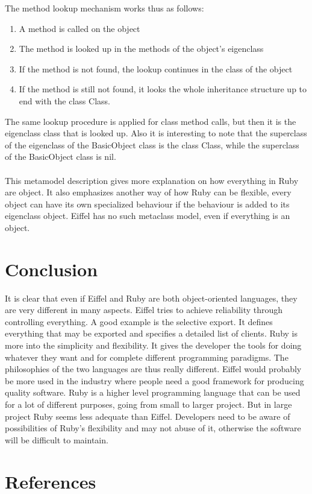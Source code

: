 \documentclass[12pt,a4paper,twocolumn]{article}
\begin{document}
The method lookup mechanism works thus as follows: 
\begin{enumerate}
	\item A method is called on the object
	\item The method is looked up in the methods of the object's eigenclass
	\item If the method is not found, the lookup continues in the class of the object
	\item If the method is still not found, it looks the whole inheritance structure up to end with the class Class. 
\end{enumerate}
The same lookup procedure is applied for class method calls, but then it is the eigenclass class that is looked up. Also it is interesting to note that the superclass of the eigenclass of the BasicObject class is the class Class, while the superclass of the BasicObject class is nil.
\\
\\
This metamodel description gives more explanation on how everything in Ruby are object. It also emphasizes another way of how Ruby can be flexible, every object can have its own specialized behaviour if the behaviour is added to its eigenclass object. Eiffel has no such metaclass model, even if everything is an object. 
\section{Conclusion}
It is clear that even if Eiffel and Ruby are both object-oriented languages, they are very different in many aspects. Eiffel tries to achieve reliability through controlling everything. A good example is the selective export. It defines everything that may be exported and specifies a detailed list of clients. Ruby is more into the simplicity and flexibility. It gives the developer the tools for doing whatever they want and for complete different programming paradigms. The philosophies of the two languages are thus really different. Eiffel would probably be more used in the industry where people need a good framework for producing quality software. Ruby is a higher level programming language that can be used for a lot of different purposes, going from small to larger project. But in large project Ruby seems less adequate than Eiffel. Developers need to be aware of possibilities of Ruby's flexibility and may not abuse of it, otherwise the software will be difficult to maintain.
\section{References}


\newpage
\end{document}
